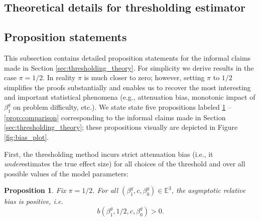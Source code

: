 \documentclass[12pt]{article}
\newtheorem{proposition}{Proposition}
\begin{document}
\begin{appendices}
	\begin{refsection}
		\section{Theoretical details for thresholding estimator}\label{sec:appendix_theory}
		
		\subsection{Proposition statements}
		This subsection contains detailed proposition statements for the informal claims made in Section \ref{sec:thresholding_theory}. For simplicity we derive results in the case $\pi = 1/2$. In reality $\pi$ is much closer to zero; however, setting $\pi$ to $1/2$ simplifies the proofs substantially and enables us to recover the most interesting and important statistical phenomena (e.g., attenuation bias, monotonic impact of $\beta^g_1$ on problem difficulty, etc.). We state state five propositions labeled \ref{prop:att_bias} -- \ref{prop:comparison} corresponding to the informal claims made in Section \ref{sec:thresholding_theory}; these propositions visually are depicted in Figure \ref{fig:bias_plot}.
		
		First, the thresholding method incurs strict attenuation bias (i.e., it \textit{under}estimates the true effect size) for all choices of the threshold and over all possible values of the model parameters:
		\begin{proposition}\label{prop:att_bias} Fix $\pi = 1/2$. For all $(\beta^g_1, c, \beta^g_0) \in \mathbb{E}^3$, the asymptotic relative bias is positive, i.e. 
			$$b(\beta^g_1, 1/2, c, \beta^g_0) > 0.$$
		\end{proposition}
		

\end{refsection}
\end{appendices}
\end{document}
